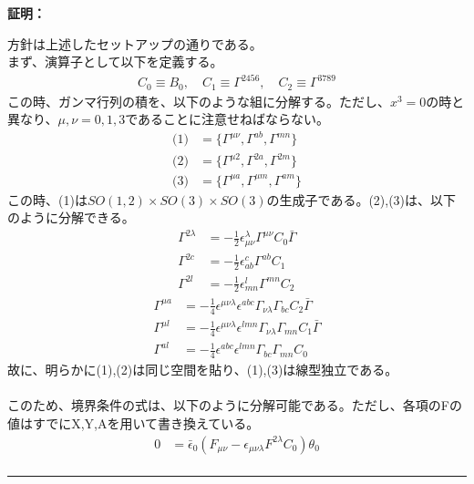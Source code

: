 \documentclass[dvipdfmx,a4paper,10.5pt]{article}
\numberwithin{equation}{section}
\newenvironment{proofbox}
{\begin{prooflabel}\textbf{証明：}\end{prooflabel}\vspace{0.8em}}
{\par\vspace{1em}\hrule\vspace{1em}}
\begin{document}
\begin{proofbox}
方針は上述したセットアップの通りである。\\
まず、演算子として以下を定義する。
\begin{align*}
    C_{0}\equiv B_{0},\quad C_{1}\equiv \Gamma^{2456},\quad C_{2}\equiv \Gamma^{3789}
\end{align*}
この時、ガンマ行列の積を、以下のような組に分解する。ただし、$x^{3}=0$の時と異なり、$\mu,\nu=0,1,3$であることに注意せねばならない。
\begin{equation}\begin{split}
    \text{(1)}&=\{\Gamma^{\mu\nu},\Gamma^{ab},\Gamma^{mn}\}\\
    \text{(2)}&=\{\Gamma^{\mu2},\Gamma^{2a},\Gamma^{2m}\}\\
    \text{(3)}&=\{\Gamma^{\mu a},\Gamma^{\mu m},\Gamma^{am}\}
\end{split} \end{equation}
この時、(1)は$SO(1,2)\times SO(3)\times SO(3)$の生成子である。(2),(3)は、以下のように分解できる。
\begin{equation}\begin{split}
    \Gamma^{2\lambda}&=-\frac{1}{2}\epsilon^{\lambda}_{\mu\nu}\Gamma^{\mu\nu}C_{0}\bar{\Gamma}\\
    \Gamma^{2c}&=-\frac{1}{2}\epsilon^{c}_{ab}\Gamma^{ab}C_{1}\\
     \Gamma^{2l}&=-\frac{1}{2}\epsilon^{l}_{mn}\Gamma^{mn}C_{2}
\end{split} \end{equation}
\begin{equation}\begin{split}
    \Gamma^{\mu a}&=-\frac{1}{4}\epsilon^{\mu\nu\lambda}\epsilon^{abc}\Gamma_{\nu\lambda}\Gamma_{bc}C_{2}\bar{\Gamma}\\
    \Gamma^{\mu l}&=-\frac{1}{4}\epsilon^{\mu\nu\lambda}\epsilon^{lmn}\Gamma_{\nu\lambda}\Gamma_{mn}C_{1}\bar{\Gamma}\\
    \Gamma^{al}&=-\frac{1}{4}\epsilon^{abc}\epsilon^{lmn}\Gamma_{bc}\Gamma_{mn}C_{0}
\end{split} \end{equation}
故に、明らかに(1),(2)は同じ空間を貼り、(1),(3)は線型独立である。\\
\\
このため、境界条件の式は、以下のように分解可能である。ただし、各項のFの値はすでにX,Y,Aを用いて書き換えている。
\begin{equation}
\begin{split}
     0&=\bar{\epsilon}_{0}(F_{\mu\nu}-\epsilon_{\mu\nu\lambda}F^{2\lambda}C_{0})\theta_{0}\\

\end{split}
\end{equation}
\end{proofbox}
\end{document}
